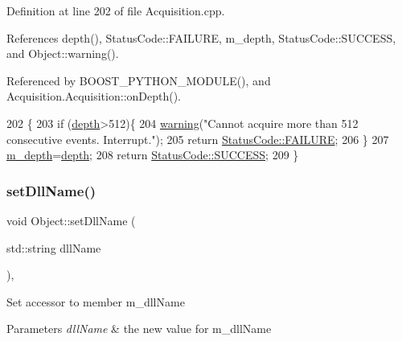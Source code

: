 Definition at line 202 of file Acquisition.\+cpp.



References depth(), Status\+Code\+::\+F\+A\+I\+L\+U\+RE, m\+\_\+depth, Status\+Code\+::\+S\+U\+C\+C\+E\+SS, and Object\+::warning().



Referenced by B\+O\+O\+S\+T\+\_\+\+P\+Y\+T\+H\+O\+N\+\_\+\+M\+O\+D\+U\+L\+E(), and Acquisition.\+Acquisition\+::on\+Depth().


\begin{DoxyCode}
202                                                     \{
203   \textcolor{keywordflow}{if} (\hyperlink{classAcquisition_a1ad973e21a067c0de0b6264d0eb5182b}{depth}>512)\{
204     \hyperlink{classObject_a65cd4fda577711660821fd2cd5a3b4c9}{warning}(\textcolor{stringliteral}{"Cannot acquire more than 512 consecutive events. Interrupt."});
205     \textcolor{keywordflow}{return} \hyperlink{classStatusCode_a6f565cbeadc76d14c72f047e5e85eb4ba3da73d4c469762eb9d3c960368252b26}{StatusCode::FAILURE};
206   \}
207   \hyperlink{classAcquisition_a26628424533a2dd74d24712a14637a72}{m\_depth}=\hyperlink{classAcquisition_a1ad973e21a067c0de0b6264d0eb5182b}{depth};
208   \textcolor{keywordflow}{return} \hyperlink{classStatusCode_a6f565cbeadc76d14c72f047e5e85eb4badd0da38d3ba0d922efd1f4619bc37ad8}{StatusCode::SUCCESS};
209 \}
\end{DoxyCode}
\mbox{\label{classObject_a870c5af919958c2136623b2d7816d123}} 
\subsubsection{\texorpdfstring{set\+Dll\+Name()}{setDllName()}}
{\footnotesize\ttfamily void Object\+::set\+Dll\+Name (\begin{DoxyParamCaption}\item[{std\+::string}]{dll\+Name }\end{DoxyParamCaption})\hspace{0.3cm}{\ttfamily [inline]}, {\ttfamily [inherited]}}

Set accessor to member m\+\_\+dll\+Name 
\begin{DoxyParams}{Parameters}
{\em dll\+Name} & the new value for m\+\_\+dll\+Name \\
\hline
\end{DoxyParams}


